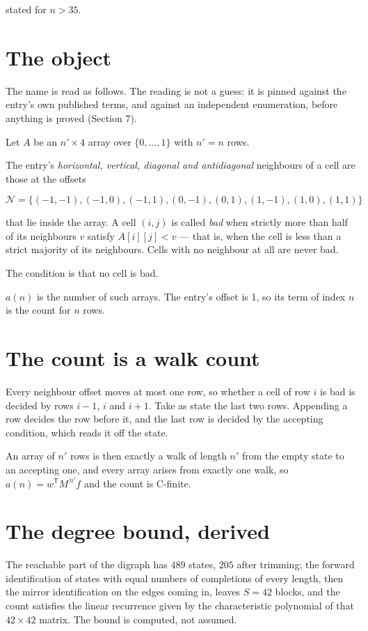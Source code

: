 \documentclass[11pt]{article}
\theoremstyle{definition}
\begin{document}
stated for $n > 35$.

\section{The object}

The name is read as follows. The reading is not a guess: it is pinned against the entry's own published terms, and against an independent enumeration, before anything is proved (Section 7).

Let $A$ be an $n' \times 4$ array over $\{0,\dots,1\}$ with $n' = n$ rows.

The entry's {\itshape horizontal, vertical, diagonal and antidiagonal} neighbours of a cell are those at the offsets

\[\mathcal{N} = \{(-1,-1), (-1,0), (-1,1), (0,-1), (0,1), (1,-1), (1,0), (1,1)\}\]

that lie inside the array. A cell $(i,j)$ is called {\itshape bad} when strictly more than half of its neighbours $v$ satisfy $A[i][j] < v$ --- that is, when the cell is less than a strict majority of its neighbours. Cells with no neighbour at all are never bad.

The condition is that no cell is bad.

$a(n)$ is the number of such arrays. The entry's offset is 1, so its term of index $n$ is the count for $n$ rows.

\section{The count is a walk count}

Every neighbour offset moves at most one row, so whether a cell of row $i$ is bad is decided by rows $i-1$, $i$ and $i+1$. Take as state the last two rows. Appending a row decides the row before it, and the last row is decided by the accepting condition, which reads it off the state.

An array of $n'$ rows is then exactly a walk of length $n'$ from the empty state to an accepting one, and every array arises from exactly one walk, so $a(n) = w^{\mathsf T}M^{\,n'}f$ and the count is C-finite.

\section{The degree bound, derived}

The reachable part of the digraph has $489$ states, $205$ after trimming; the forward identification of states with equal numbers of completions of every length, then the mirror identification on the edges coming in, leaves $S = 42$ blocks, and the count satisfies the linear recurrence given by the characteristic polynomial of that $42\times42$ matrix. The bound is computed, not assumed.
\end{document}
